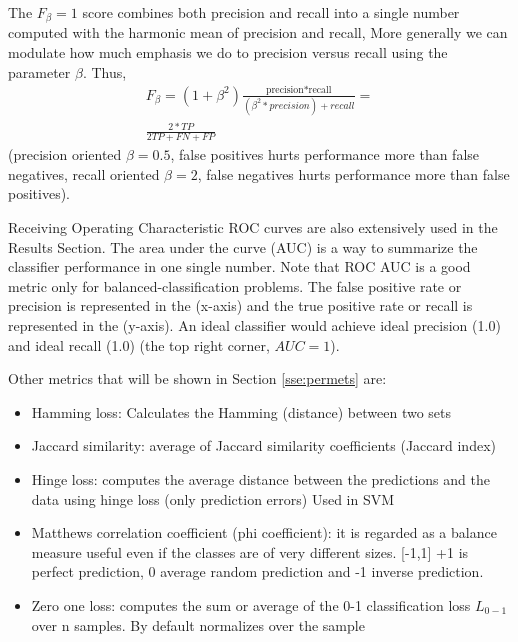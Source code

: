 \documentclass[11pt]{article}
\theoremstyle{definition}
\theoremstyle{remark}
\begin{document}
The $F_{\beta}=1$ score combines both precision and recall into a single number computed with the harmonic mean of precision and recall, More generally we can modulate how much emphasis we do to precision versus recall using the parameter $\beta$. Thus, 
\begin{equation*}
\begin{split}
F_{\beta} = (1+\beta^2)\frac{\text{precision*recall}}{(\beta^2 * precision)+recall} =\\ \frac{2 * TP}{2TP + FN + FP}
\end{split}
\end{equation*}
(precision oriented $\beta=0.5$, false positives hurts performance more than false negatives, recall oriented $\beta=2$, false negatives hurts performance more than false positives).

Receiving Operating Characteristic ROC curves are also extensively used in the Results Section. The area under the curve (AUC) is a way to summarize the classifier performance in one single number. Note that ROC AUC is a good metric only for balanced-classification problems. The false positive rate or precision is represented in the (x-axis) and the true positive rate or recall is represented in the (y-axis). An ideal classifier would achieve ideal precision (1.0) and ideal recall (1.0) (the top right corner, $AUC=1$).

Other metrics that will be shown in Section \ref{sse:permets} are:
\begin{itemize}
	\item Hamming loss: Calculates the Hamming (distance) between two sets
	\item Jaccard similarity: average of Jaccard similarity coefficients (Jaccard index)
	\item Hinge loss: computes the average distance between the predictions and the data using hinge loss (only prediction errors) Used in SVM
	\item Matthews correlation coefficient (phi coefficient): it is regarded as a balance measure useful even if the classes are of very different sizes. [-1,1] +1 is perfect prediction, 0 average random prediction and -1 inverse prediction. %
	\item Zero one loss: computes the sum or average of the 0-1 classification loss $L_{0-1}$ over n samples. By default normalizes over the sample
\end{itemize}
\end{document}

